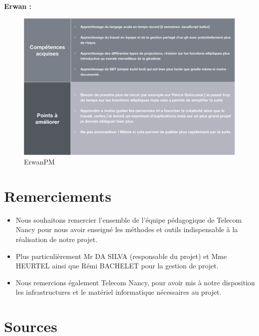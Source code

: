\documentclass{article}
\begin{document}
    \textbf{Erwan :}
    \begin{figure}[H]
        \centering
        \includegraphics[scale=0.45]{ErwanPM.png}
        \caption{ErwanPM}
        \label{fig:erwanpm}
    \end{figure}
    
    

\section{ Remerciements}


\begin{itemize}
    \item Nous souhaitons remercier l’ensemble de l’équipe pédagogique de Telecom Nancy pour nous avoir enseigné les méthodes et outils indispensable à la réalisation de notre projet.
    \item Plus particulièrement Mr DA SILVA (responsable du projet) et Mme HEURTEL ainsi que Rémi BACHELET pour la gestion de projet.
    \item Nous remercions également Telecom Nancy, pour avoir mis à notre disposition les infrastructures et le matériel informatique nécessaires au projet.
    \end{itemize}

\section{ Sources }
\end{document}
